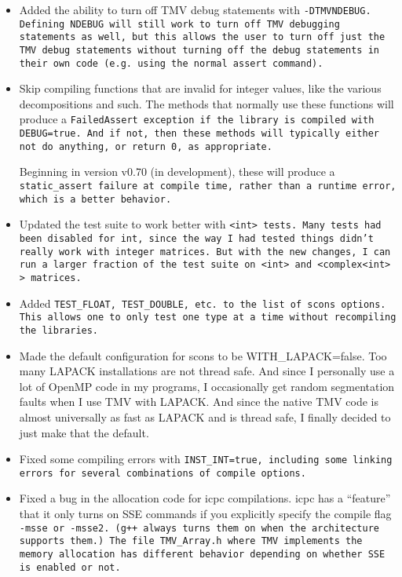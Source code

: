 \begin{itemize}
\item Added the ability to turn off TMV debug statements with \tt{-DTMVNDEBUG}.
Defining \tt{NDEBUG} will still work to turn off TMV debugging statements as well, but this
allows the user to turn off just the TMV debug statements without turning off the debug
statements in their own code (e.g.\ using the normal \tt{assert} command).

\item Skip compiling functions that are invalid for integer values, like the various decompositions 
and such.  The methods that normally use these functions will produce a \tt{FailedAssert}
exception if the library is compiled with \tt{DEBUG=true}.  And if not, then these methods 
will typically either not do anything, or return 0, as appropriate.  

Beginning in version v0.70 (in development), these will produce a \tt{static\_assert} failure
at compile time, rather than a runtime error, which is a better behavior.

\item Updated the test suite to work better with \tt{<int>} tests.  Many tests had been disabled
for \tt{int}, since the way I had tested things didn't really work with integer matrices.
But with the new changes, I can run a larger fraction of the test suite on \tt{<int>} and
\tt{<complex<int> >} matrices.

\item Added \tt{TEST\_FLOAT}, \tt{TEST\_DOUBLE}, etc. to the list of scons options.  
  This allows one to only test one type at a time without recompiling the libraries.

\item Made the default configuration for scons to be WITH\_LAPACK=false.
   Too many LAPACK installations are not thread safe.  And since I 
   personally use a lot of OpenMP code in my programs, I occasionally
   get random segmentation faults when I use TMV with LAPACK.  
   And since the native TMV code is almost universally as fast as LAPACK
   and is thread safe, I finally decided to just make that the default.

\item Fixed some compiling errors with \tt{INST_INT=true}, including some linking errors 
for several combinations of compile options.

\item Fixed a bug in the allocation code for icpc compilations.
   icpc has a ``feature'' that it only turns on SSE commands if you explicitly
   specify the compile flag \tt{-msse} or \tt{-msse2}.  (g++ always turns them on
   when the architecture supports them.)  The file \tt{TMV\_Array.h} where TMV implements
   the memory allocation has different
   behavior depending on whether SSE is enabled or not.


\end{itemize}
